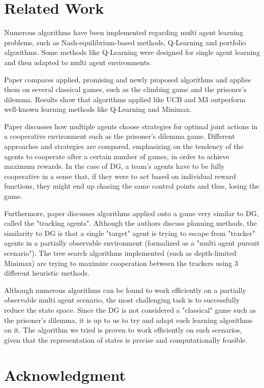 \documentclass[conference]{IEEEtran}
\begin{document}
\section{Related Work}

Numerous algorithms have been implemented regarding multi agent learning problems, such as Nash-equilibrium-based methods, Q-Learning and portfolio algorithms\cite{bouzy}. Some methods like Q-Learning were designed for single agent learning and then adapted to multi agent environments.

Paper \cite{bouzy} compares applied, promising and newly proposed algorithms and applies them on several classical games, such as the climbing game and the prisoner's dilemma. Results show that algorithms applied like UCB and M3 outperform well-known learning methods like Q-Learning and Minimax.

Paper \cite{mach} discusses how multiple agents choose strategies for optimal joint actions in a cooperative environment such as the prisoner's dilemma game. Different approaches and strategies are compared, emphasizing on the tendency of the agents to cooperate after a certain number of games, in order to achieve maximum rewards. In the case of DG, a team's agents have to be fully cooperative in a sense that, if they were to act based on individual reward functions, they might end up chasing the same control points and thus, losing the game.

Furthermore, paper \cite{strats} discusses algorithms applied onto a game very similar to DG, called the "tracking agents". Although the authors discuss planning methods, the similarity to DG is that a single "target" agent is trying to escape from "tracker" agents in a partially observable environment (formalized as a "multi agent pursuit scenario"). The tree search algorithms implemented (such as depth-limited Minimax) are trying to maximize cooperation between the trackers using 3 different heuristic methods.

Although numerous algorithms can be found to work efficiently on a partially observable multi agent scenario, the most challenging task is to successfully reduce the state space. Since the DG is not considered a "classical" game such as the prisoner's dilemma, it is up to us to try and adapt such learning algorithms on it. The algorithm we tried is proven to work efficiently on such scenarios, given that the representation of states is precise and computationally feasible.


\section*{Acknowledgment}
\end{document}
